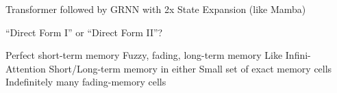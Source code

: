 \begin{slide}[\slideopts,toc={TransMamba}]{Transformer followed by GRNN with 2x State Expansion (like Mamba)}
\vspace{-1.6em}
\vspace{-2em}
\maybepause
{} %
\end{slide}


\begin{slide}[\slideopts,toc={Direct Forms}]{``Direct Form I'' or ``Direct Form II''?}
  \vspace{-1.6em}
  \vspace{-2em}
  \begin{multicols}{2}
    \begin{itemize}
    \mpitem Perfect short-term memory
    \mpitem Fuzzy, fading, long-term memory
    \mpitem Like Infini-Attention
      \columnbreak
    \mpitem Short/Long-term memory in either
    \mpitem Small set of exact memory cells
    \mpitem Indefinitely many fading-memory cells
    \end{itemize}
  \end{multicols}
\end{slide}

